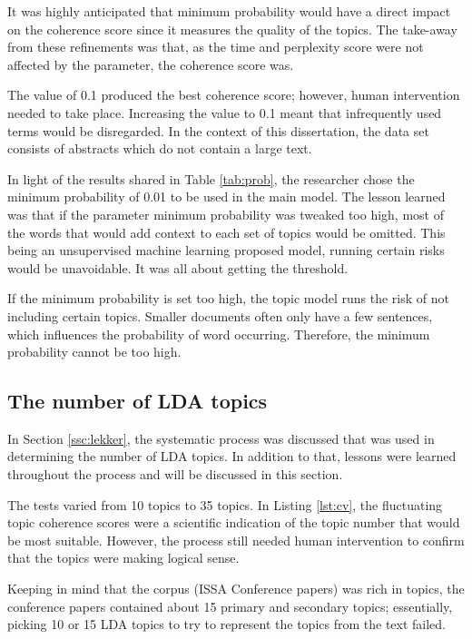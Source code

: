 It was highly anticipated that minimum probability would have a direct impact on the coherence score since it measures the quality of the topics. The take-away from these refinements was that, as the time and perplexity score were not affected by the parameter, the coherence score was.

The value of 0.1 produced the best coherence score; however, human intervention needed to take place. Increasing the value to 0.1 meant that infrequently used terms would be disregarded. In the context of this dissertation, the data set consists of abstracts which do not contain a large text.

In light of the results shared in Table \ref{tab:prob}, the researcher chose the minimum probability of 0.01 to be used in the main model. The lesson learned was that if the parameter minimum probability was tweaked too high, most of the words that would add context to each set of topics would be omitted. This being an unsupervised machine learning proposed model, running certain risks would be unavoidable. It was all about getting the threshold.

\begin{lesson}
If the minimum probability is set too high, the topic model runs the risk of not including certain topics. Smaller documents often only have a few sentences, which influences the probability of word occurring. Therefore, the minimum probability cannot be too high.
\end{lesson}\label{L:probability}

\subsection{The number of LDA topics}

In Section \ref{ssc:lekker}, the systematic process was discussed that was used in determining the number of LDA topics. In addition to that, lessons were learned throughout the process and will be discussed in this section.

The tests varied from 10 topics to 35 topics. In Listing \ref{lst:cv}, the fluctuating topic coherence scores were a scientific indication of the topic number that would be most suitable. However, the process still needed human intervention to confirm that the topics were making logical sense.

Keeping in mind that the corpus (ISSA Conference papers) was rich in topics, the conference papers contained about 15 primary and secondary topics; essentially, picking 10 or 15 LDA topics to try to represent the topics from the text failed.

